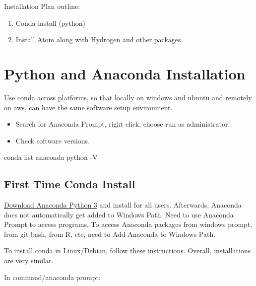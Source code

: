 \documentclass[]{article}
\newenvironment{Shaded}{\begin{snugshade}}{\end{snugshade}}
\newcommand{\ExtensionTok}[1]{#1}
\newcommand{\NormalTok}[1]{#1}
\providecommand{\tightlist}{%
  \setlength{\itemsep}{0pt}\setlength{\parskip}{0pt}}
\begin{document}
Installation Plan outline:

\begin{enumerate}
\def\labelenumi{\arabic{enumi}.}
\tightlist
\item
  Conda install (python)
\item
  Install Atom along with Hydrogen and other packages.
\end{enumerate}

\hypertarget{python-and-anaconda-installation}{%
\section{Python and Anaconda
Installation}\label{python-and-anaconda-installation}}

Use conda across platforms, so that locally on windows and ubuntu and
remotely on aws, can have the same software setup environment.

\begin{itemize}
\tightlist
\item
  Search for Anaconda Prompt, right click, choose run as administrator.
\item
  Check software versions.
\end{itemize}

\begin{Shaded}
\begin{Highlighting}[]
\ExtensionTok{conda}\NormalTok{ list anaconda}
\ExtensionTok{python}\NormalTok{ -V}
\end{Highlighting}
\end{Shaded}

\hypertarget{first-time-conda-install}{%
\subsection{First Time Conda Install}\label{first-time-conda-install}}

\href{https://www.anaconda.com/distribution/}{Download Anaconda Python
3} and install for all users. Afterwards, Anaconda does not
automatically get added to Windows Path. Need to use Anaconda Prompt to
access programs. To access Anaconda packages from windows prompt, from
git bash, from R, etc, need to Add Anaconda to Windows Path.

To install conda in Linux/Debian, follow
\href{https://fanwangecon.github.io/Tex4Econ/nontex/install/linux/fn_ubuntu.html}{these
instructions}. Overall, installations are very similar.

In command/anaconda prompt:
\end{document}
